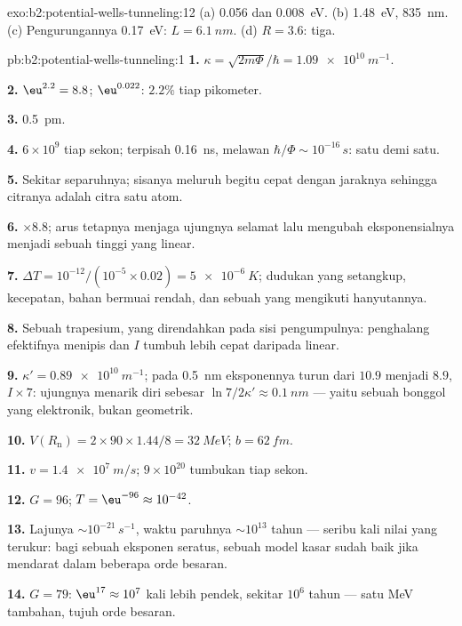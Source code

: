 \begin{solution}{exo:b2:potential-wells-tunneling:12}
(a) \qty{0.056}{} dan \qty{0.008}{eV}. (b) \qty{1.48}{eV}, \qty{835}{nm}. (c) Pengurungannya
\qty{0.17}{eV}: $L = \qty{6.1}{nm}$. (d) $R = 3.6$: tiga.
\end{solution}

\begin{solution}{pb:b2:potential-wells-tunneling:1}
\textbf{1.} $\kappa = \sqrt{2m\Phi}/\hbar = \qty{1.09e10}{m^{-1}}$.

\textbf{2.} $\eu^{2.2} = 8.8$; $\eu^{0.022}$: $2.2\%$ tiap pikometer.

\textbf{3.} \qty{0.5}{pm}.

\textbf{4.} $6 \times 10^9$ tiap sekon; terpisah \qty{0.16}{ns}, melawan $\hbar/\Phi
\sim 10^{-16}\,\unit{s}$: satu demi satu.

\textbf{5.} Sekitar separuhnya; sisanya meluruh begitu cepat dengan jaraknya sehingga
citranya adalah citra satu atom.

\textbf{6.} $\times 8.8$; arus tetapnya menjaga ujungnya selamat lalu mengubah
eksponensialnya menjadi sebuah tinggi yang linear.

\textbf{7.} $\Delta T = 10^{-12}/(10^{-5} \times 0.02) = \qty{5e-6}{K}$; dudukan yang
setangkup, kecepatan, bahan bermuai rendah, dan sebuah  yang mengikuti
hanyutannya.

\textbf{8.} Sebuah trapesium, yang direndahkan pada sisi pengumpulnya: penghalang
efektifnya menipis dan $I$ tumbuh lebih cepat daripada linear.

\textbf{9.} $\kappa' = \qty{0.89e10}{m^{-1}}$; pada \qty{0.5}{nm} eksponennya turun dari
$10.9$ menjadi $8.9$, $I \times 7$: ujungnya menarik diri sebesar $\ln 7/2\kappa' \approx \qty{0.1}{nm}$
--- yaitu sebuah bonggol yang elektronik, bukan geometrik.

\textbf{10.} $V(R_{\text{n}}) = 2 \times 90 \times 1.44/8 = \qty{32}{MeV}$; $b = \qty{62}{fm}$.

\textbf{11.} $v = \qty{1.4e7}{m/s}$; $9 \times 10^{20}$ tumbukan tiap sekon.

\textbf{12.} $G = 96$; $T = \eu^{-96} \approx 10^{-42}$.

\textbf{13.} Lajunya $\sim 10^{-21}\,\unit{s^{-1}}$, waktu paruhnya $\sim 10^{13}$ tahun --- seribu
kali nilai yang terukur: bagi sebuah eksponen seratus, sebuah model
kasar sudah baik jika mendarat dalam beberapa orde besaran.

\textbf{14.} $G = 79$: $\eu^{17} \approx 10^7$ kali lebih pendek, sekitar $10^6$ tahun ---
satu MeV tambahan, tujuh orde besaran.


\end{solution}
